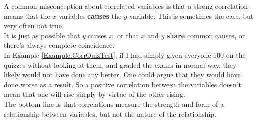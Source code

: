 A common misconception about correlated variables is that a strong correlation means that the $x$ variables \textbf{causes} the $y$ variable.  This is sometimes the case, but very often not true.\\

It is just as possible that $y$ causes $x$, or that $x$ and $y$ \textbf{share} common causes, or there's always complete coincidence.\\

In Example \ref{Example:CorrQuizTest}, if I had simply given everyone 100 on the quizzes without looking at them, and graded the exams in normal way, they likely would not have done any better.  One could argue that they would have done worse as a result.  So a positive correlation between the variables doesn't mean that one will rise simply by virtue of the other rising.\\

The bottom line is that correlations measure the strength and form of a relationship between variables, but not the nature of the relationship.










